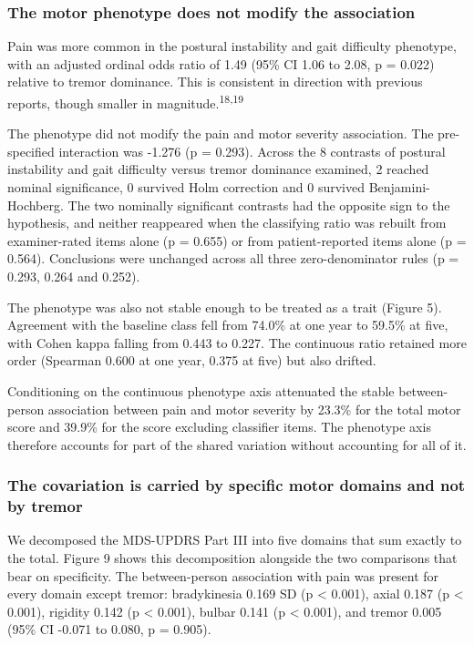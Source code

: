 \documentclass[
  english,
  12pt,
]{article}
\begin{document}
\subsubsection{The motor phenotype does not modify the association}\label{the-motor-phenotype-does-not-modify-the-association}

Pain was more common in the postural instability and gait difficulty phenotype, with an adjusted ordinal odds ratio of 1.49 (95\% CI 1.06 to 2.08, p = 0.022) relative to tremor dominance. This is consistent in direction with previous reports, though smaller in magnitude.\textsuperscript{18,19}

The phenotype did not modify the pain and motor severity association. The pre-specified interaction was -1.276 (p = 0.293). Across the 8 contrasts of postural instability and gait difficulty versus tremor dominance examined, 2 reached nominal significance, 0 survived Holm correction and 0 survived Benjamini-Hochberg. The two nominally significant contrasts had the opposite sign to the hypothesis, and neither reappeared when the classifying ratio was rebuilt from examiner-rated items alone (p = 0.655) or from patient-reported items alone (p = 0.564). Conclusions were unchanged across all three zero-denominator rules (p = 0.293, 0.264 and 0.252).

The phenotype was also not stable enough to be treated as a trait (Figure 5). Agreement with the baseline class fell from 74.0\% at one year to 59.5\% at five, with Cohen kappa falling from 0.443 to 0.227. The continuous ratio retained more order (Spearman 0.600 at one year, 0.375 at five) but also drifted.

Conditioning on the continuous phenotype axis attenuated the stable between-person association between pain and motor severity by 23.3\% for the total motor score and 39.9\% for the score excluding classifier items. The phenotype axis therefore accounts for part of the shared variation without accounting for all of it.

\subsubsection{The covariation is carried by specific motor domains and not by tremor}\label{the-covariation-is-carried-by-specific-motor-domains-and-not-by-tremor}

We decomposed the MDS-UPDRS Part III into five domains that sum exactly to the total. Figure 9 shows this decomposition alongside the two comparisons that bear on specificity. The between-person association with pain was present for every domain except tremor: bradykinesia 0.169 SD (p \textless{} 0.001), axial 0.187 (p \textless{} 0.001), rigidity 0.142 (p \textless{} 0.001), bulbar 0.141 (p \textless{} 0.001), and tremor 0.005 (95\% CI -0.071 to 0.080, p = 0.905).
\end{document}
